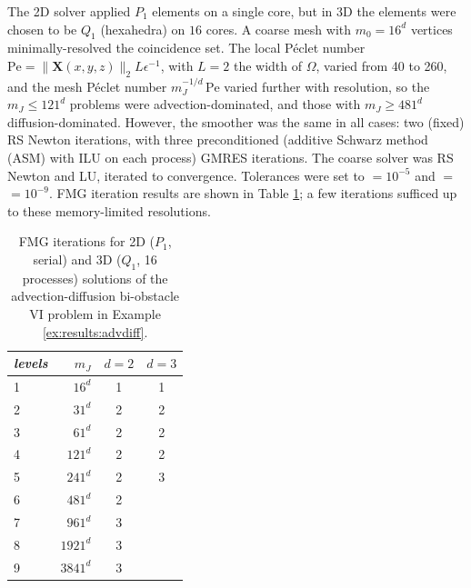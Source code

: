 \documentclass[review,hidelinks,onefignum,onetabnum]{siamart220329}
\newcommand{\eps}{\epsilon}
\newcommand{\bX}{\mathbf{X}}
\begin{document}
\begin{example}
The 2D solver applied $P_1$ elements on a single core, but in 3D the elements were chosen to be $Q_1$ (hexahedra) on $16$ cores.  A coarse mesh with $m_0=16^d$ vertices minimally-resolved the coincidence set.  The local Péclet number $\text{Pe}=\|\bX(x,y,z)\|_2 L \eps^{-1}$, with $L=2$ the width of $\Omega$, varied from 40 to 260, and the mesh Péclet number $m_J^{-1/d}\,\text{Pe}$ varied further with resolution, so the $m_J\le 121^d$ problems were advection-dominated, and those with $m_J\ge 481^d$ diffusion-dominated.  However, the smoother was the same in all cases: two (fixed) RS Newton iterations, with three preconditioned (additive Schwarz method (ASM) with ILU on each process) GMRES iterations.  The coarse solver was RS Newton and LU, iterated to convergence.  Tolerances were set to  $=10^{-5}$ and  $=$  $= 10^{-9}$.  FMG iteration results are shown in Table \ref{tab:results:advdiff}; a few iterations sufficed up to these memory-limited resolutions.
\end{example}

\begin{table}[ht]
\centering
\begin{tabular}{lr@{\hskip 7mm}c@{\hskip 4mm}c}
\toprule
\emph{levels} & $m_J$ & $d=2$ & $d=3$ \\
\midrule
 1 &    $16^d$ & 1 & 1 \\
 2 &    $31^d$ & 2 & 2 \\
 3 &    $61^d$ & 2 & 2 \\
 4 &   $121^d$ & 2 & 2 \\
 5 &   $241^d$ & 2 & 3 \\
 6 &   $481^d$ & 2 \\
 7 &   $961^d$ & 3 \\
 8 &  $1921^d$ & 3 \\
 9 &  $3841^d$ & 3 \\
\bottomrule
\end{tabular}
\bigskip
\caption{FMG iterations for 2D ($P_1$, serial) and 3D ($Q_1$, 16 processes) solutions of the advection-diffusion bi-obstacle VI problem in Example \ref{ex:results:advdiff}.}
\label{tab:results:advdiff}
\end{table}
\end{document}
